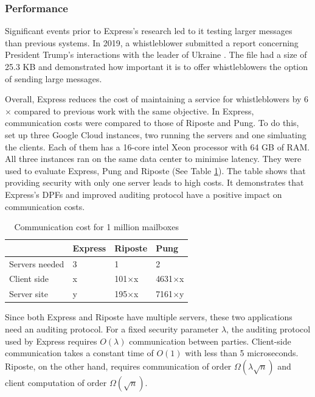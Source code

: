 \documentclass[a4paper]{article}
\begin{document}
\subsubsection{Performance}
Significant events prior to Express's research led to it testing larger messages than previous systems. In 2019, a whistleblower submitted a report concerning President Trump's interactions with the leader of Ukraine \citep{WhistleblowerComplaint}. The file had a size of 25.3 KB and demonstrated how important it is to offer whistleblowers the option of sending large messages.

Overall, Express reduces the cost of maintaining a service for whistleblowers by 6$\times$ compared to previous work with the same objective.
In Express, communication costs were compared to those of Riposte and Pung. To do this, \citet{Eskandarian2021} set up three Google Cloud instances, two running the servers and one simluating the clients. Each of them has a 16-core intel Xeon processor with 64 GB of RAM. All three instances ran on the same data center to minimise latency. They were used to evaluate Express, Pung and Riposte (See Table \ref{tab:communication}). The table shows that providing security with only one server leads to high costs. It demonstrates that Express's DPFs and improved auditing protocol have a positive impact on communication costs.
\begin{table}[h!]
\centering
\caption{Communication cost for 1 million mailboxes}
\label{tab:communication}
\begin{tabular}{llll}
\hline
 & Express & Riposte & Pung \\ \hline
Servers needed                             & 3       & 1     & 2       \\ \hline
Client side                                & x       & 101$\times$x & 4631$\times$x  \\ \hline
Server site                                & y       & 195$\times$x & 7161$\times$y  \\ \hline
\end{tabular}
\end{table}

Since both Express and Riposte have multiple servers, these two applications need an auditing protocol. For a fixed security parameter $\lambda$, the auditing protocol used by Express requires $O(\lambda)$ communication between parties. Client-side communication takes a constant time of $O(1)$ with less than 5 microseconds. Riposte, on the other hand, requires communication of order $\Omega (\lambda \sqrt{n})$ and client computation of order $\Omega (\sqrt{n})$. 
\end{document}

